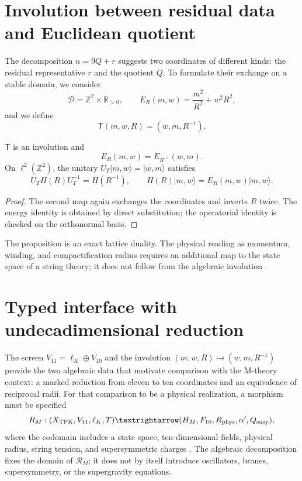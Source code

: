 \section{Involution between residual data and Euclidean quotient}

The decomposition \(n=9Q+r\) suggests two coordinates of different kinds:
the residual representative \(r\) and the quotient \(Q\). To formulate their
exchange on a stable domain, we consider
\[
 \mathcal D=\mathbb Z^2\times\mathbb R_{>0},
\qquad
 E_R(m,w)=\frac{m^2}{R^2}+w^2R^2,
\]
and we define
\[
 \mathsf T(m,w,R)=(w,m,R^{-1}).
\]
\begin{proposition}
\(\mathsf T\) is an involution and
\[
 E_R(m,w)=E_{R^{-1}}(w,m).
\]
On \(\ell^2(\mathbb Z^2)\), the unitary
\(U_T|m,w\rangle=|w,m\rangle\) satisfies
\[
 U_TH(R)U_T^{-1}=H(R^{-1}),
\qquad
 H(R)|m,w\rangle=E_R(m,w)|m,w\rangle.
\]
\end{proposition}
\begin{proof}
The second map again exchanges the coordinates and inverts
\(R\) twice. The energy identity is obtained by direct substitution; the
operatorial identity is checked on the orthonormal basis.
\end{proof}

The proposition is an exact lattice duality. The physical reading as
momentum, winding, and compactification radius requires an additional map
to the state space of a string theory; it does not follow from the
algebraic involution \cite{Giveon1994}.

\section{Typed interface with undecadimensional reduction}

The screen \(V_{11}=\ell_K\oplus V_{10}\) and the involution
\((m,w,R)\mapsto(w,m,R^{-1})\) provide the two algebraic data that
motivate comparison with the M-theory context: a marked reduction
from eleven to ten coordinates and an equivalence of reciprocal radii. For
that comparison to be a physical realization, a morphism must be specified
\[
 \mathcal R_M:
 (\mathcal X_{\rm TPK},V_{11},\ell_K,\mathsf T)
 \longrightarrow
 (\mathcal H_M,\mathcal F_{10},R_{\rm phys},\alpha',
 \mathcal Q_{\rm susy}),
\]
where the codomain includes a state space, ten-dimensional
fields, physical radius, string tension, and supersymmetric charges
\cite{Witten1995}. The algebraic decomposition fixes the domain of
\(\mathcal R_M\); it does not by itself introduce oscillators, branes,
supersymmetry, or the supergravity equations.

